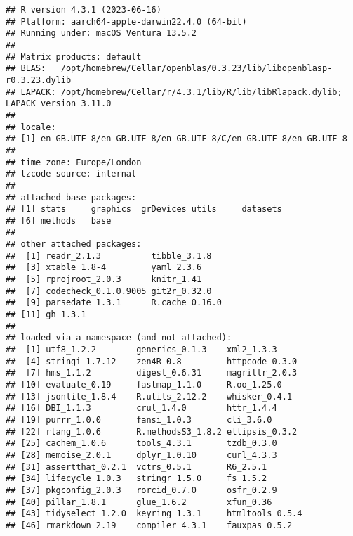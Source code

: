 \documentclass[
]{article}
\begin{document}
\begin{verbatim}
## R version 4.3.1 (2023-06-16)
## Platform: aarch64-apple-darwin22.4.0 (64-bit)
## Running under: macOS Ventura 13.5.2
## 
## Matrix products: default
## BLAS:   /opt/homebrew/Cellar/openblas/0.3.23/lib/libopenblasp-r0.3.23.dylib 
## LAPACK: /opt/homebrew/Cellar/r/4.3.1/lib/R/lib/libRlapack.dylib;  LAPACK version 3.11.0
## 
## locale:
## [1] en_GB.UTF-8/en_GB.UTF-8/en_GB.UTF-8/C/en_GB.UTF-8/en_GB.UTF-8
## 
## time zone: Europe/London
## tzcode source: internal
## 
## attached base packages:
## [1] stats     graphics  grDevices utils     datasets 
## [6] methods   base     
## 
## other attached packages:
##  [1] readr_2.1.3          tibble_3.1.8        
##  [3] xtable_1.8-4         yaml_2.3.6          
##  [5] rprojroot_2.0.3      knitr_1.41          
##  [7] codecheck_0.1.0.9005 git2r_0.32.0        
##  [9] parsedate_1.3.1      R.cache_0.16.0      
## [11] gh_1.3.1            
## 
## loaded via a namespace (and not attached):
##  [1] utf8_1.2.2        generics_0.1.3    xml2_1.3.3       
##  [4] stringi_1.7.12    zen4R_0.8         httpcode_0.3.0   
##  [7] hms_1.1.2         digest_0.6.31     magrittr_2.0.3   
## [10] evaluate_0.19     fastmap_1.1.0     R.oo_1.25.0      
## [13] jsonlite_1.8.4    R.utils_2.12.2    whisker_0.4.1    
## [16] DBI_1.1.3         crul_1.4.0        httr_1.4.4       
## [19] purrr_1.0.0       fansi_1.0.3       cli_3.6.0        
## [22] rlang_1.0.6       R.methodsS3_1.8.2 ellipsis_0.3.2   
## [25] cachem_1.0.6      tools_4.3.1       tzdb_0.3.0       
## [28] memoise_2.0.1     dplyr_1.0.10      curl_4.3.3       
## [31] assertthat_0.2.1  vctrs_0.5.1       R6_2.5.1         
## [34] lifecycle_1.0.3   stringr_1.5.0     fs_1.5.2         
## [37] pkgconfig_2.0.3   rorcid_0.7.0      osfr_0.2.9       
## [40] pillar_1.8.1      glue_1.6.2        xfun_0.36        
## [43] tidyselect_1.2.0  keyring_1.3.1     htmltools_0.5.4  
## [46] rmarkdown_2.19    compiler_4.3.1    fauxpas_0.5.2
\end{verbatim}
\end{document}
